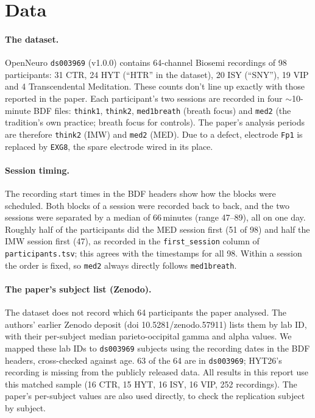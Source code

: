 \documentclass[10pt,a4paper]{article}
\begin{document}

\section{Data}
\label{sec:data}

\paragraph{The dataset.} OpenNeuro \texttt{ds003969} (v1.0.0) contains 64-channel Biosemi recordings of 98
participants: 31 CTR, 24 HYT (``HTR'' in the dataset), 20 ISY (``SNY''), 19 VIP and 4 Transcendental Meditation. 
These counts don't line up exactly with those reported in the paper.
Each participant's two sessions are recorded in four $\sim$10-minute BDF files: \texttt{think1}, \texttt{think2},
\texttt{med1breath} (breath focus) and \texttt{med2} (the tradition's own practice; breath focus for controls).
The paper's analysis periods are therefore \texttt{think2} (IMW) and \texttt{med2} (MED).
Due to a defect, electrode \texttt{Fp1} is replaced by \texttt{EXG8}, the spare electrode wired in its place.

\paragraph{Session timing.} The recording start times in the BDF headers show how the blocks were scheduled. Both
blocks of a session were recorded back to back, and the two sessions were separated by a
median of 66\,minutes (range 47--89), all on one day. Roughly half of the participants did the MED session first (51 of 98) and half
the IMW session first (47), as recorded in the \texttt{first\_session} column of \texttt{participants.tsv}; this agrees
with the timestamps for all 98. Within a session the order is fixed, so \texttt{med2} always directly follows
\texttt{med1breath}. 

\paragraph{The paper's subject list (Zenodo).} The dataset does not record which 64 participants the paper analysed.
The authors' earlier Zenodo deposit (doi 10.5281/zenodo.57911) lists them by lab ID, with their per-subject median
parieto-occipital gamma and alpha values. We mapped these lab IDs to \texttt{ds003969} subjects using the recording
dates in the BDF headers, cross-checked against age. 63 of the 64 are in \texttt{ds003969}; HYT26's recording is 
missing from the publicly released data. All results in this report use this matched sample (16 CTR, 15 HYT, 16 ISY, 16 VIP, 252
recordings). The paper's per-subject
values are also used directly, to check the replication subject by subject. 
\end{document}
